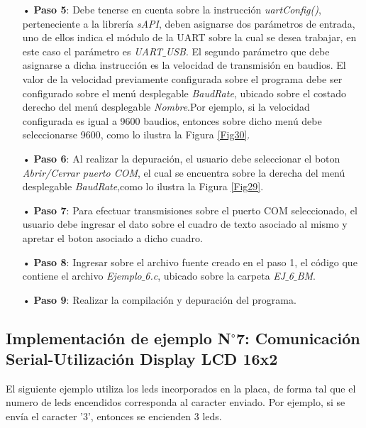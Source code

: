 \documentclass[12pt,letterpaper]{article}
\begin{document}
\begin{enumerate}
\item[•]\textbf{Paso 5}: Debe tenerse en cuenta sobre la instrucción \textit{uartConfig()}, perteneciente a la librería \textit{sAPI}, deben asignarse dos parámetros de entrada, uno de ellos indica el módulo de la UART sobre la cual se desea trabajar, en este caso el parámetro es \textit{UART$\_$USB}. El segundo parámetro que debe asignarse a dicha instrucción es la velocidad de transmisión en baudios. El valor de la velocidad previamente configurada sobre el programa debe ser configurado sobre el menú desplegable \textit{BaudRate}, ubicado sobre el costado derecho del menú desplegable \textit{Nombre}.Por ejemplo, si la velocidad configurada es igual a 9600 baudios, entonces sobre dicho menú debe seleccionarse 9600, como lo ilustra la Figura \ref{Fig30}.
\item[•]\textbf{Paso 6}: Al realizar la depuración, el usuario debe seleccionar el boton \textit{Abrir/Cerrar puerto COM}, el cual se encuentra sobre la derecha del menú desplegable \textit{BaudRate},como lo ilustra la Figura \ref{Fig29}.
\item[•]\textbf{Paso 7}: Para efectuar transmisiones sobre el puerto COM seleccionado, el usuario debe ingresar el dato sobre el cuadro de texto asociado al mismo y apretar el boton asociado a dicho cuadro.
\item[•]\textbf{Paso 8}: Ingresar sobre el archivo fuente creado en el paso 1, el código que contiene el archivo \textit{Ejemplo$\_$6.c}, ubicado sobre la carpeta \textit{EJ$\_$6$\_$BM}.
\item[•]\textbf{Paso 9}: Realizar la compilación y depuración del programa.
\end{enumerate}

\subsection{Implementación de ejemplo N$^{\circ}$7: Comunicación Serial-Utilización Display LCD 16x2}
El siguiente ejemplo utiliza los leds incorporados en la placa, de forma tal que el numero de leds encendidos corresponda al caracter enviado. Por ejemplo, si se envía el caracter '3', entonces se encienden 3 leds.
\end{document}
